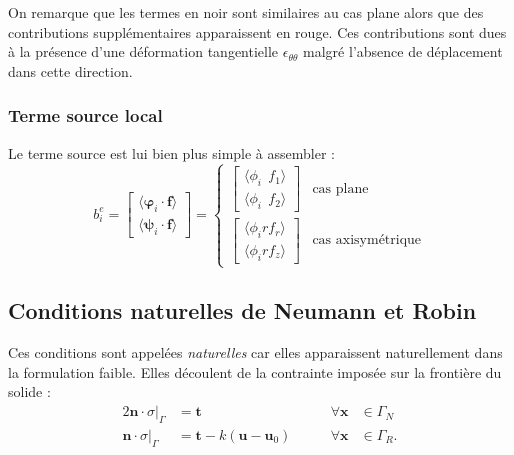 \documentclass[12pt]{article}
\newcommand{\xx}{\mathbf{x}}
\newcommand{\shapeu}{\boldsymbol{\varphi}}
\newcommand{\shapev}{\boldsymbol{\psi}}
\begin{document}
On remarque que les termes en noir sont similaires au cas plane alors que
des contributions supplémentaires apparaissent en rouge. Ces contributions sont
dues à la présence d'une déformation tangentielle $\epsilon_{\theta\theta}$ 
malgré l'absence de déplacement dans cette direction.

\subsubsection{Terme source local}
Le terme source est lui bien plus simple à assembler :
\begin{equation}
    b_{i}^e = 
    \begin{bmatrix}
        \langle\shapeu_i \cdot \mathbf{f}\rangle\\
        \langle\shapev_i \cdot \mathbf{f}\rangle
    \end{bmatrix} =
    \left\{
        \begin{array}{ll}
            \begin{bmatrix}
                \langle\phi_i \phantom{r} f_1\rangle\\
                \langle\phi_i \phantom{r} f_2\rangle
            \end{bmatrix} & \text{cas plane}
            \\[1em]
            \begin{bmatrix}
                \langle\phi_i r f_r\rangle\\
                \langle\phi_i r f_z\rangle
            \end{bmatrix} & \text{cas axisymétrique}
        \end{array}
    \right.
\end{equation}


\subsection{Conditions naturelles de Neumann et Robin}
Ces conditions sont appelées \textit{naturelles} car elles apparaissent
naturellement dans la formulation faible. Elles découlent de la contrainte 
imposée sur la frontière du solide :
\begin{alignat}{2}
    \mathbf{n} \cdot \sigma \vert_{\Gamma} &= \mathbf{t} 
        \qquad& \forall \xx &\in \Gamma_N\\
    \mathbf{n} \cdot \sigma \vert_{\Gamma} &= \mathbf{t} - 
        k (\mathbf{u} - \mathbf{u}_0) \qquad& \forall \xx &\in \Gamma_R.
\end{alignat}
\end{document}
